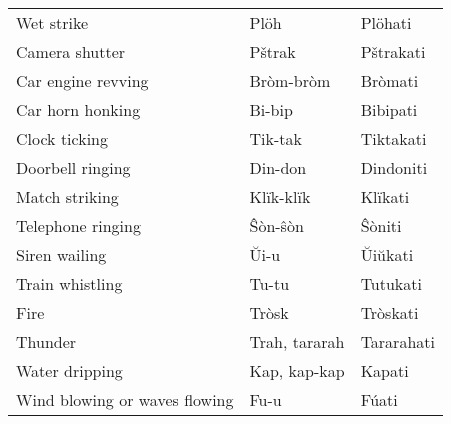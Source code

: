 \begin{longtable}{p{10em}p{5em}p{5em}}
		Wet strike & Plöh & Plöhati \\
		Camera shutter & Pštrak & Pštrakati \\
		Car engine revving & Bròm-bròm & Bròmati \\
		Car horn honking & Bi-bip & Bibipati \\
		Clock ticking & Tik-tak & Tiktakati \\
		Doorbell ringing & Din-don & Dindoniti \\
		Match striking & Klïk-klïk & Klïkati \\
		Telephone ringing & Ŝòn-ŝòn & Ŝòniti \\
		Siren wailing & Ŭi-u & Ŭiŭkati \\
		Train whistling & Tu-tu & Tutukati \\
		Fire & Tròsk & Tròskati \\
		Thunder & Trah, tararah & Tararahati \\
		Water dripping & Kap, kap-kap & Kapati \\
		Wind blowing or waves flowing & Fu-u & Fúati \\
\end{longtable}